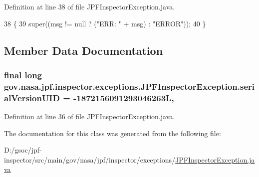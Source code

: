 Definition at line 38 of file J\+P\+F\+Inspector\+Exception.\+java.


\begin{DoxyCode}
38                                                \{
39     super((msg != null ? (\textcolor{stringliteral}{"ERR: "} + msg) : \textcolor{stringliteral}{"ERROR"}));
40   \}
\end{DoxyCode}


\subsection{Member Data Documentation}
\subsubsection[{\texorpdfstring{serial\+Version\+U\+ID}{serialVersionUID}}]{\setlength{\rightskip}{0pt plus 5cm}final long gov.\+nasa.\+jpf.\+inspector.\+exceptions.\+J\+P\+F\+Inspector\+Exception.\+serial\+Version\+U\+ID = -\/1872156091293046263L\hspace{0.3cm}{\ttfamily [static]}, {\ttfamily [private]}}\hypertarget{classgov_1_1nasa_1_1jpf_1_1inspector_1_1exceptions_1_1_j_p_f_inspector_exception_ae4635f9308c4f4992ff2e825c40e17c6}{}\label{classgov_1_1nasa_1_1jpf_1_1inspector_1_1exceptions_1_1_j_p_f_inspector_exception_ae4635f9308c4f4992ff2e825c40e17c6}


Definition at line 36 of file J\+P\+F\+Inspector\+Exception.\+java.



The documentation for this class was generated from the following file\+:\begin{DoxyCompactItemize}
\item 
D\+:/gsoc/jpf-\/inspector/src/main/gov/nasa/jpf/inspector/exceptions/\hyperlink{_j_p_f_inspector_exception_8java}{J\+P\+F\+Inspector\+Exception.\+java}\end{DoxyCompactItemize}
